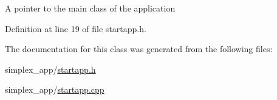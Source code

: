 A pointer to the main class of the application 

Definition at line 19 of file startapp.\+h.



The documentation for this class was generated from the following files\+:\begin{DoxyCompactItemize}
\item 
simplex\+\_\+app/\hyperlink{startapp_8h}{startapp.\+h}\item 
simplex\+\_\+app/\hyperlink{startapp_8cpp}{startapp.\+cpp}\end{DoxyCompactItemize}
